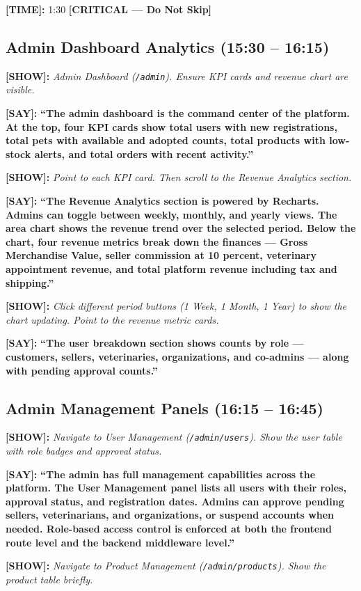 \documentclass[12pt,a4paper]{article}
\newcommand{\say}[1]{\textbf{\textcolor{narration}{[SAY]:}} \textbf{``#1''}}
\newcommand{\show}[1]{\textbf{\textcolor{screen}{[SHOW]:}} \textit{#1}}
\newcommand{\timing}[1]{\textbf{\textcolor{timing}{[TIME]:}} #1}
\newcommand{\critical}{\textcolor{critical}{\textbf{[CRITICAL --- Do Not Skip]}}}
\begin{document}
\timing{1:30} \hfill \critical

\subsection{Admin Dashboard Analytics (15:30 -- 16:15)}

\show{Admin Dashboard (\texttt{/admin}). Ensure KPI cards and revenue chart are visible.}

\say{The admin dashboard is the command center of the platform. At the top, four KPI cards show total users with new registrations, total pets with available and adopted counts, total products with low-stock alerts, and total orders with recent activity.}

\show{Point to each KPI card. Then scroll to the Revenue Analytics section.}

\say{The Revenue Analytics section is powered by Recharts. Admins can toggle between weekly, monthly, and yearly views. The area chart shows the revenue trend over the selected period. Below the chart, four revenue metrics break down the finances --- Gross Merchandise Value, seller commission at 10 percent, veterinary appointment revenue, and total platform revenue including tax and shipping.}

\show{Click different period buttons (1 Week, 1 Month, 1 Year) to show the chart updating. Point to the revenue metric cards.}

\say{The user breakdown section shows counts by role --- customers, sellers, veterinaries, organizations, and co-admins --- along with pending approval counts.}

\subsection{Admin Management Panels (16:15 -- 16:45)}

\show{Navigate to User Management (\texttt{/admin/users}). Show the user table with role badges and approval status.}

\say{The admin has full management capabilities across the platform. The User Management panel lists all users with their roles, approval status, and registration dates. Admins can approve pending sellers, veterinarians, and organizations, or suspend accounts when needed. Role-based access control is enforced at both the frontend route level and the backend middleware level.}

\show{Navigate to Product Management (\texttt{/admin/products}). Show the product table briefly.}
\end{document}
